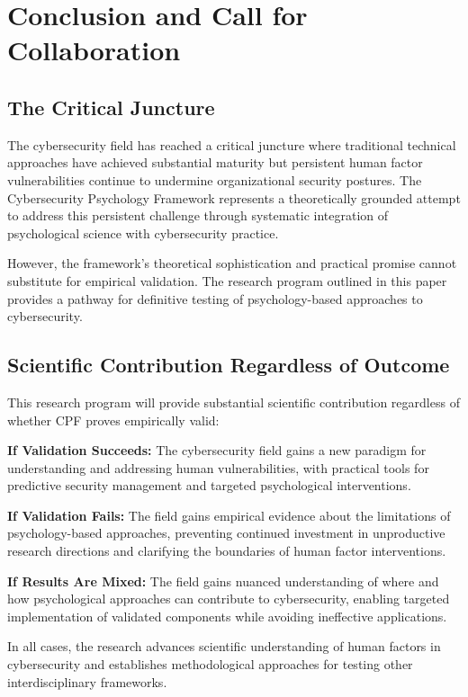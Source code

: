 \documentclass[11pt,a4paper]{article}
\begin{document}
\section{Conclusion and Call for Collaboration}

\subsection{The Critical Juncture}

The cybersecurity field has reached a critical juncture where traditional technical approaches have achieved substantial maturity but persistent human factor vulnerabilities continue to undermine organizational security postures. The Cybersecurity Psychology Framework represents a theoretically grounded attempt to address this persistent challenge through systematic integration of psychological science with cybersecurity practice.

However, the framework's theoretical sophistication and practical promise cannot substitute for empirical validation. The research program outlined in this paper provides a pathway for definitive testing of psychology-based approaches to cybersecurity.

\subsection{Scientific Contribution Regardless of Outcome}

This research program will provide substantial scientific contribution regardless of whether CPF proves empirically valid:

\textbf{If Validation Succeeds:} The cybersecurity field gains a new paradigm for understanding and addressing human vulnerabilities, with practical tools for predictive security management and targeted psychological interventions.

\textbf{If Validation Fails:} The field gains empirical evidence about the limitations of psychology-based approaches, preventing continued investment in unproductive research directions and clarifying the boundaries of human factor interventions.

\textbf{If Results Are Mixed:} The field gains nuanced understanding of where and how psychological approaches can contribute to cybersecurity, enabling targeted implementation of validated components while avoiding ineffective applications.

In all cases, the research advances scientific understanding of human factors in cybersecurity and establishes methodological approaches for testing other interdisciplinary frameworks.
\end{document}
